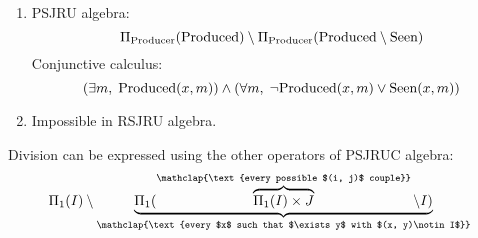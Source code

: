 \documentclass{../../cs-classes/cs-classes}
\newcommand*{\seen}{\textnormal{Seen}}
\newcommand*{\produced}{\textnormal{Produced}}
\newcommand*{\producer}{\textnormal{Producer}}
\begin{document}
\begin{exercise}
\begin{enumerate}
    \item PSJRU algebra:
    \begin{equation*}
        \Pi_{\producer}(\produced)\setminus \Pi_{\producer}(\produced\setminus\seen)
    \end{equation*}
    Conjunctive calculus:
    \begin{equation*}
        (\exists m, \; \produced(x, m))\land(\forall m, \; \lnot\produced(x, m)\lor\seen(x, m))
    \end{equation*}
    
    \item Impossible in RSJRU algebra.

  \end{enumerate}  
\end{exercise}

\begin{exercise}
    Division can be expressed using the other operators of PSJRUC algebra:
    \begin{equation*}
        \Pi_1(I)\setminus \underbrace{\Pi_1(\overbrace{\Pi_1(I)\times J}^{\mathclap{\text{every possible $(i, j)$ couple}}} \setminus I)}_{\mathclap{\text{every $x$ such that $\exists y$ with $(x, y)\notin I$}}}
    \end{equation*}
\end{exercise}
\end{document}
